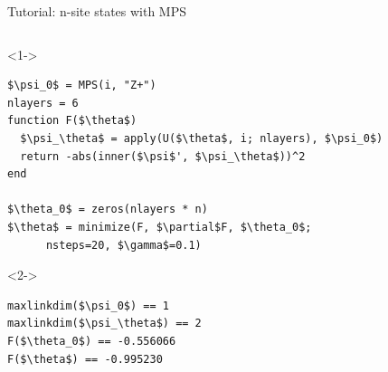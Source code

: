 \begin{frame}[fragile]{Tutorial: n-site states with MPS}

\begin{columns}

\begin{column}{5.5cm}

\begin{onlyenv}<1->
\begin{lstlisting}[language=JuliaLocal, style=julia, mathescape, basicstyle=\scriptsize\ttfamily]
$\psi_0$ = MPS(i, "Z+")
nlayers = 6
function F($\theta$)
  $\psi_\theta$ = apply(U($\theta$, i; nlayers), $\psi_0$)
  return -abs(inner($\psi$', $\psi_\theta$))^2
end

$\theta_0$ = zeros(nlayers * n)
$\theta$ = minimize(F, $\partial$F, $\theta_0$;
      nsteps=20, $\gamma$=0.1)
\end{lstlisting}
\end{onlyenv}


\begin{onlyenv}<2->
\begin{lstlisting}[language=JuliaLocal, style=julia, mathescape, basicstyle=\scriptsize\ttfamily]
maxlinkdim($\psi_0$) == 1
maxlinkdim($\psi_\theta$) == 2
F($\theta_0$) == -0.556066
F($\theta$) == -0.995230
\end{lstlisting}
\end{onlyenv}

\end{column}

\begin{column}{4.5cm}



\end{column}
\end{columns}
\end{frame}
